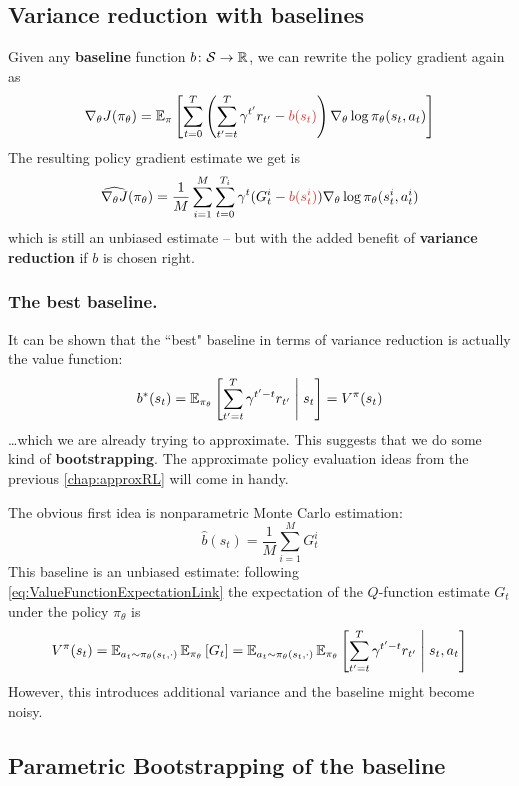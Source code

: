\documentclass[../course-notes.tex]{subfiles}
\begin{document}
\subsection{Variance reduction with baselines}

Given any \textbf{\bluefont baseline} function $b\colon \mathcal{S} \to \mathbb{R}$, we can rewrite the policy gradient again as
\begin{equation}\label{eq:PolicyGradBaseline}
\nabla_\theta J(\pi_\theta) =
\EE_\pi \left[
\sum_{t=0}^T
\left(
\sum_{t'=t}^T \gamma^{t'} r_{t'} - {\redfont b(s_t)}
\right)
\nabla_\theta \log\pi_\theta(s_t, a_t)
\right]
\end{equation}
The resulting policy gradient estimate we get is
\begin{equation}\label{eq:MCPolicyGradBaseline}
\widehat{\nabla_\theta J}(\pi_\theta) =
\frac{1}{M}\sum_{i=1}^M
\sum_{t=0}^{T_i}
\gamma^t (G^i_t - {\redfont b(s^i_t)})
\nabla_\theta \log\pi_\theta (s_t^i, a_t^i)
\end{equation}
which is still an unbiased estimate -- but with the added benefit of \textbf{variance reduction} if $b$ is chosen right.

\subsubsection{The best baseline.}

It can be shown that the ``best" baseline in terms of variance reduction is actually the value function:
\[
b^*(s_t) = \operatorname{\mathbb{E}}_{\pi_\theta}\left[\sum_{t'=t}^T \gamma^{t'-t} r_{t'} \;\middle|\; s_t \right]
= V^\pi(s_t)
\]
\ldots which we are already trying to approximate. This suggests that we do some kind of \textbf{bootstrapping}. The approximate policy evaluation ideas from the previous \cref{chap:approxRL} will come in handy.

The obvious first idea is nonparametric Monte Carlo estimation:
\[
	\widehat{b}(s_t) = \frac{1}{M}\sum_{i=1}^M G^i_t
\]
This baseline is an unbiased estimate: following \cref{eq:ValueFunctionExpectationLink} the expectation of the $Q$-function estimate $G_t$ under the policy $\pi_\theta$ is
\[
	V^\pi(s_t) =
	\operatorname{\mathbb{E}}_{a_t\sim \pi_\theta(s_t,\cdot)}
	\operatorname{\mathbb{E}}_{\pi_\theta}
	\left[G_t\right] =
	\operatorname{\mathbb{E}}_{a_t\sim\pi_\theta(s_t,\cdot)}
	\operatorname{\mathbb{E}}_{\pi_\theta}
	\left[
	\sum_{t'=t}^T \gamma^{t'-t}r_{t'}
	\;\middle|\; s_t,a_t
	\right]
\]
However, this introduces additional variance and the baseline might become noisy.



\subsection{Parametric Bootstrapping of the baseline}\label{sec:REINFORCEparametricBaseline}
\end{document}
